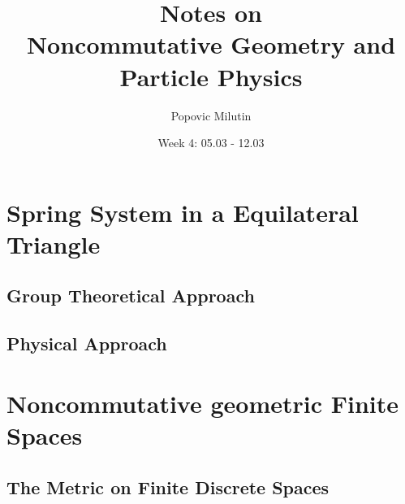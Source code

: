 \documentclass[a4paper]{article}
\title{Notes on \\ Noncommutative Geometry and Particle Physics}
\author{Popovic Milutin}
\date{Week 4: 05.03 - 12.03}
\theoremstyle{definition}
\theoremstyle{definition}
\theoremstyle{theorem}
\theoremstyle{theorem}
\theoremstyle{definition}
\begin{document}
\maketitle
\tableofcontents

\section{Spring System in a Equilateral Triangle}
\subsection{Group Theoretical Approach}
\subsection{Physical Approach}
\section{Noncommutative geometric Finite Spaces}
\subsection{The Metric on Finite Discrete Spaces}
\end{document}
